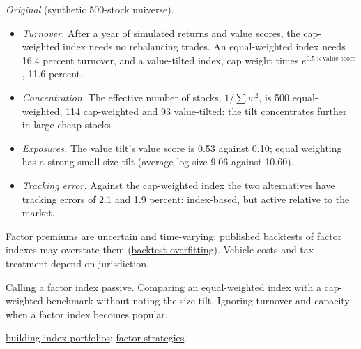 \begin{qfdefinition}
 \emph{Original} (synthetic 500-stock universe).
\begin{itemize}
\item \emph{Turnover.} After a year of simulated returns and value scores, the cap-weighted index needs no rebalancing trades. An equal-weighted index needs 16.4 percent turnover, and a value-tilted index, cap weight times $e^{0.5\times\text{value score}}$, 11.6 percent.
\item \emph{Concentration.} The effective number of stocks, $1/\sum w^2$, is 500 equal-weighted, 114 cap-weighted and 93 value-tilted: the tilt concentrates further in large cheap stocks.
\item \emph{Exposures.} The value tilt's value score is 0.53 against 0.10; equal weighting has a strong small-size tilt (average log size 9.06 against 10.60).
\item \emph{Tracking error.} Against the cap-weighted index the two alternatives have tracking errors of 2.1 and 1.9 percent: index-based, but active relative to the market.
\end{itemize}

 Factor premiums are uncertain and time-varying; published backtests of factor indexes may overstate them (\hyperref[meth:deflated-sharpe-ratio]{backtest overfitting}). Vehicle costs and tax treatment depend on jurisdiction.

 Calling a factor index passive. Comparing an equal-weighted index with a cap-weighted benchmark without noting the size tilt. Ignoring turnover and capacity when a factor index becomes popular.

 \hyperref[meth:index-equity-portfolio-construction]{building index portfolios}; \hyperref[def:active-equity-strategies]{factor strategies}.

\end{qfdefinition}

